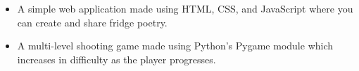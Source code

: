 \begin{itemize}
  \item A simple web application made using HTML, CSS, and JavaScript where you can create and share fridge poetry.
\end{itemize}
\divider\small

\begin{itemize}
  \item A multi-level shooting game made using Python's Pygame module which increases in difficulty as the player progresses.
\end{itemize}




